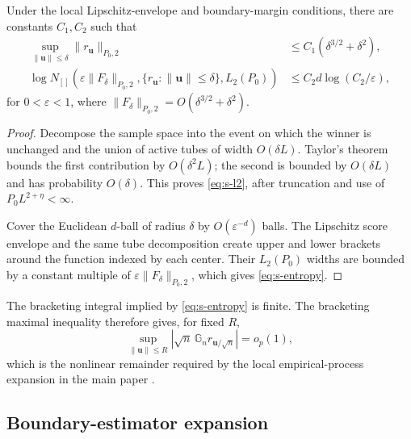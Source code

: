 \begin{lemma}
\label{lem:s-entropy}
Under the local Lipschitz-envelope and boundary-margin conditions, there are
constants $C_1,C_2$ such that
\begin{align}
 \sup_{\|\mathbf{u}\|\leq\delta}
 \|r_{\mathbf{u}}\|_{P_0,2}
 &\leq C_1(\delta^{3/2}+\delta^2),                         \label{eq:s-l2}\\
 \log N_{[]}
 \left(\varepsilon\|F_\delta\|_{P_0,2},
       \{r_{\mathbf{u}}:\|\mathbf{u}\|\leq\delta\},
       L_2(P_0)\right)
 &\leq C_2d\log(C_2/\varepsilon),                         \label{eq:s-entropy}
\end{align}
for $0<\varepsilon<1$, where
$\|F_\delta\|_{P_0,2}=O(\delta^{3/2}+\delta^2)$.
\end{lemma}

\begin{proof}
Decompose the sample space into the event on which the winner is unchanged and
the union of active tubes of width $O(\delta L)$.  Taylor's theorem bounds the
first contribution by $O(\delta^2L)$; the second is bounded by
$O(\delta L)$ and has probability $O(\delta)$.  This proves
\eqref{eq:s-l2}, after truncation and use of $P_0L^{2+\eta}<\infty$.

Cover the Euclidean $d$-ball of radius $\delta$ by
$O(\varepsilon^{-d})$ balls.  The Lipschitz score envelope and the same tube
decomposition create upper and lower brackets around the function indexed by
each center.  Their $L_2(P_0)$ widths are bounded by a constant multiple of
$\varepsilon\|F_\delta\|_{P_0,2}$, which gives
\eqref{eq:s-entropy}.
\end{proof}

The bracketing integral implied by \eqref{eq:s-entropy} is finite.  The
bracketing maximal inequality therefore gives, for fixed $R$,
\[
 \sup_{\|\mathbf{u}\|\leq R}
 \left|\sqrt n\,\mathbb G_n
 r_{\mathbf{u}/\sqrt n}\right|=o_p(1),
\]
which is the nonlinear remainder required by the local empirical-process
expansion in the main paper \citep{van1996weak}.

\subsection{Boundary-estimator expansion}

